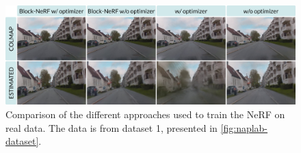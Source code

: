 \begin{figure}[h]
    \centering
    \includegraphics[width=1.0\textwidth]{figures/trip086-comparison.png}
    \caption{Comparison of the different approaches used to train the NeRF on real data. The data is from dataset 1, presented in \autoref{fig:naplab-dataset}.}
    \label{fig:trip086-comparison}
\end{figure}
